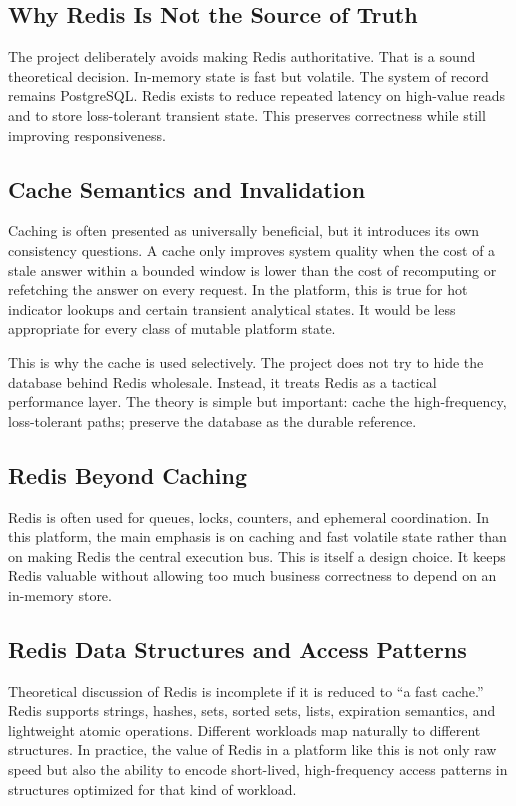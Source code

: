 \subsection{Why Redis Is Not the Source of Truth}
The project deliberately avoids making Redis authoritative. That is a sound theoretical decision. In-memory state is fast but volatile. The system of record remains PostgreSQL. Redis exists to reduce repeated latency on high-value reads and to store loss-tolerant transient state. This preserves correctness while still improving responsiveness.

\subsection{Cache Semantics and Invalidation}
Caching is often presented as universally beneficial, but it introduces its own consistency questions. A cache only improves system quality when the cost of a stale answer within a bounded window is lower than the cost of recomputing or refetching the answer on every request. In the platform, this is true for hot indicator lookups and certain transient analytical states. It would be less appropriate for every class of mutable platform state.

This is why the cache is used selectively. The project does not try to hide the database behind Redis wholesale. Instead, it treats Redis as a tactical performance layer. The theory is simple but important: cache the high-frequency, loss-tolerant paths; preserve the database as the durable reference.

\subsection{Redis Beyond Caching}
Redis is often used for queues, locks, counters, and ephemeral coordination. In this platform, the main emphasis is on caching and fast volatile state rather than on making Redis the central execution bus. This is itself a design choice. It keeps Redis valuable without allowing too much business correctness to depend on an in-memory store.

\subsection{Redis Data Structures and Access Patterns}
Theoretical discussion of Redis is incomplete if it is reduced to ``a fast cache.'' Redis supports strings, hashes, sets, sorted sets, lists, expiration semantics, and lightweight atomic operations. Different workloads map naturally to different structures. In practice, the value of Redis in a platform like this is not only raw speed but also the ability to encode short-lived, high-frequency access patterns in structures optimized for that kind of workload.

